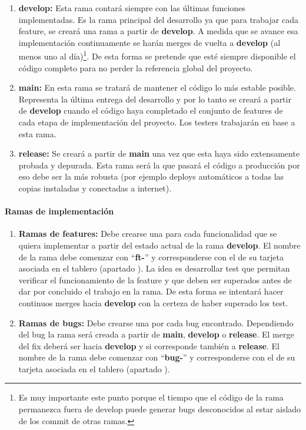 \begin{enumerate}
	\renewcommand{\labelenumi}{\alph{enumi}.}
	\item \textbf{develop:} Esta rama contará siempre con las últimas funciones implementadas. Es la rama principal del desarrollo ya que para trabajar cada feature, se creará una rama a partir de \textbf{develop}. A medida que se avance esa implementación continuamente se harán merges de vuelta a \textbf{develop} (al menos uno al día)\footnote{Es muy importante este punto porque el tiempo que el código de la rama permanezca fuera de develop puede generar bugs desconocidos al estar aislado de los commit de otras ramas.}. De esta forma se pretende que esté siempre disponible el código completo para no perder la referencia global del proyecto. 
	
	\item \textbf{main:} En esta rama se tratará de mantener el código lo más estable posible. Representa la última entrega del desarrollo y por lo tanto se creará a partir de \textbf{develop} cuando el código haya completado el conjunto de features de cada etapa de implementación del proyecto. Los testers trabajarán en base a esta rama. 
	
	\item \textbf{release:} Se creará a partir de \textbf{main} una vez que esta haya sido extensamente probada y depurada. Esta rama será la que pasará el código a producción por eso debe ser la más robusta (por ejemplo deploys automáticos a todas las copias instaladas y conectadas a internet).
\end{enumerate}

\paragraph{Ramas de implementación}\label{pg:ramas-de-implementacion}
\begin{enumerate}
	\renewcommand{\labelenumi}{\alph{enumi}.}
	\item \textbf{Ramas de features:} Debe crearse una para cada funcionalidad que se quiera implementar a partir del estado actual de la rama \textbf{develop}. El nombre de la rama debe comenzar con “\textbf{ft-}” y corresponderse con el de su tarjeta asociada en el tablero (apartado ). La idea es desarrollar test que permitan verificar el funcionamiento de la feature y que deben ser superados antes de dar por concluido el trabajo en la rama. De esta forma se intentará hacer continuos merges hacia \textbf{develop} con la certeza de haber superado los test.
	
	\item \textbf{Ramas de bugs:} Debe crearse una por cada bug encontrado. Dependiendo del bug la rama será creada a partir de \textbf{main}, \textbf{develop} o \textbf{release}. El merge del fix deberá ser hacia \textbf{develop} y si corresponde también a \textbf{release}. El nombre de la rama debe comenzar con “\textbf{bug-}” y corresponderse con el de su tarjeta asociada en el tablero (apartado ).
\end{enumerate}

